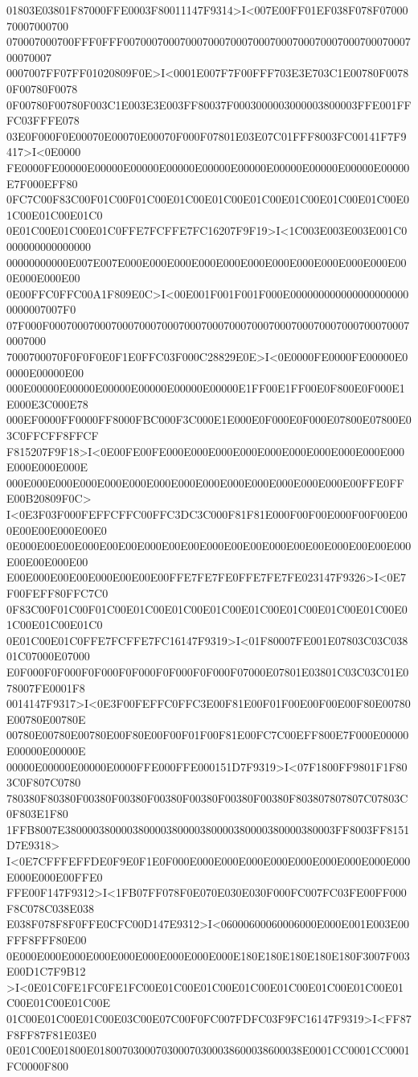 01803E03801F87000FFE0003F80011147F9314>I<007E00FF01EF038F078F0700070007000700
070007000700FFF0FFF00700070007000700070007000700070007000700070007000700070007
0007007FF07FF01020809F0E>I<0001E007F7F00FFF703E3E703C1E00780F00780F00780F0078
0F00780F00780F003C1E003E3E003FF80037F0003000003000003800003FFE001FFFC03FFFE078
03E0F000F0E00070E00070E00070F000F07801E03E07C01FFF8003FC00141F7F9417>I<0E0000
FE0000FE00000E00000E00000E00000E00000E00000E00000E00000E00000E00000E7F000EFF80
0FC7C00F83C00F01C00F01C00E01C00E01C00E01C00E01C00E01C00E01C00E01C00E01C00E01C0
0E01C00E01C00E01C0FFE7FCFFE7FC16207F9F19>I<1C003E003E003E001C0000000000000000
00000000000E007E007E000E000E000E000E000E000E000E000E000E000E000E000E000E000E00
0E00FFC0FFC00A1F809E0C>I<00E001F001F001F000E0000000000000000000000000007007F0
07F000F00070007000700070007000700070007000700070007000700070007000700070007000
7000700070F0F0F0E0F1E0FFC03F000C28829E0E>I<0E0000FE0000FE00000E00000E00000E00
000E00000E00000E00000E00000E00000E00000E1FF00E1FF00E0F800E0F000E1E000E3C000E78
000EF0000FF0000FF8000FBC000F3C000E1E000E0F000E0F000E07800E07800E03C0FFCFF8FFCF
F815207F9F18>I<0E00FE00FE000E000E000E000E000E000E000E000E000E000E000E000E000E
000E000E000E000E000E000E000E000E000E000E000E000E000E000E00FFE0FFE00B20809F0C>
I<0E3F03F000FEFFCFFC00FFC3DC3C000F81F81E000F00F00E000F00F00E000E00E00E000E00E0
0E000E00E00E000E00E00E000E00E00E000E00E00E000E00E00E000E00E00E000E00E00E000E00
E00E000E00E00E000E00E00E00FFE7FE7FE0FFE7FE7FE023147F9326>I<0E7F00FEFF80FFC7C0
0F83C00F01C00F01C00E01C00E01C00E01C00E01C00E01C00E01C00E01C00E01C00E01C00E01C0
0E01C00E01C0FFE7FCFFE7FC16147F9319>I<01F80007FE001E07803C03C03801C07000E07000
E0F000F0F000F0F000F0F000F0F000F0F000F07000E07801E03801C03C03C01E078007FE0001F8
0014147F9317>I<0E3F00FEFFC0FFC3E00F81E00F01F00E00F00E00F80E00780E00780E00780E
00780E00780E00780E00F80E00F00F01F00F81E00FC7C00EFF800E7F000E00000E00000E00000E
00000E00000E00000E0000FFE000FFE000151D7F9319>I<07F1800FF9801F1F803C0F807C0780
780380F80380F00380F00380F00380F00380F00380F00380F803807807807C07803C0F803E1F80
1FFB8007E380000380000380000380000380000380000380000380003FF8003FF8151D7E9318>
I<0E7CFFFEFFDE0F9E0F1E0F000E000E000E000E000E000E000E000E000E000E000E000E00FFE0
FFE00F147F9312>I<1FB07FF078F0E070E030E030F000FC007FC03FE00FF000F8C078C038E038
E038F078F8F0FFE0CFC00D147E9312>I<06000600060006000E000E001E003E00FFF8FFF80E00
0E000E000E000E000E000E000E000E000E000E180E180E180E180E180F3007F003E00D1C7F9B12
>I<0E01C0FE1FC0FE1FC00E01C00E01C00E01C00E01C00E01C00E01C00E01C00E01C00E01C00E
01C00E01C00E01C00E03C00E07C00F0FC007FDFC03F9FC16147F9319>I<FF87F8FF87F81E03E0
0E01C00E01800E0180070300070300070300038600038600038E0001CC0001CC0001FC0000F800
